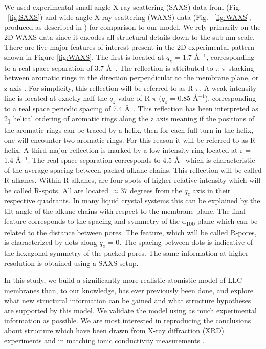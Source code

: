 \documentclass{article}
\newcommand{\angstrom}{\textup{\AA}}
\begin{document}
  We used experimental small-angle X-ray scattering (SAXS) data from
  \cite{feng_thin_2016} (Fig. ~\ref{fig:SAXS}) and wide angle X-ray scattering
  (WAXS) data (Fig. ~\ref{fig:WAXS}, produced as described in
  \cite{feng_scalable_2014}) for comparison to our model. We rely primarily on the 2D WAXS data
  since it encodes all structural details down to the sub-nm scale.  There are
  five major features of interest present in the 2D experimental pattern shown in
  Figure \ref{fig:WAXS}. The first is located at $q_z$ = 1.7 \angstrom$^{-1}$,
  corresponding to a real space separation of 3.7 \angstrom~.  The reflection is
  attributed to $\pi$-$\pi$ stacking between aromatic rings in the direction
  perpendicular to the membrane plane, or z-axis \cite{feng_scalable_2014}. For
  simplicity, this reflection will be referred to as R-$\pi$. A weak intensity
  line is located at exactly half the $q_z$ value of R-$\pi$ ($q_z$ = 0.85
  \angstrom$^{-1}$), corresponding to a real space periodic spacing of 7.4
  \angstrom~. This reflection has been interpreted as 2\textsubscript{1} helical
  ordering of aromatic rings along the z axis meaning if the positions of the
  aromatic rings can be traced by a helix, then for each full turn in the helix, one
  will encounter two aromatic rings. For this reason it will be referred to as
  R-helix. A third major reflection is marked by a low intensity ring located at
  r = 1.4 \angstrom$^{-1}$. The real space separation corresponds to 4.5 \angstrom~
  which is characteristic of the average spacing between packed alkane chains.
  This reflection will be called R-alkanes. Within R-alkanes, are four spots of
  higher relative intensity which will be called R-spots. All are located
  $\approx 37$ degrees from the $q_z$ axis in their respective quadrants. In many
  liquid crystal systems this can be explained by the tilt angle of the alkane
  chains with respect to the membrane plane. The final feature corresponds to the
  spacing and symmetry of the d\textsubscript{100} plane which can be related to
  the distance between pores.  The feature, which will be called R-pores, is
  characterized by dots along $q_z$ = 0. The spacing between dots is indicative
  of the hexagonal symmetry of the packed pores. The same information at higher
  resolution is obtained using a SAXS setup. 

  In this study, we build a significantly more realistic atomistic model of LLC
  membranes than, to our knowledge, has ever previously been done, and explore
  what new structural information can be gained and what structure hypotheses are
  supported by this model. We validate the model using as much experimental
  information as possible. We are most interested in reproducing the conclusions
  about structure which have been drawn from X-ray diffraction (XRD) experiments
  and in matching ionic conductivity measurements \cite{feng_thin_2016}.
\end{document}
